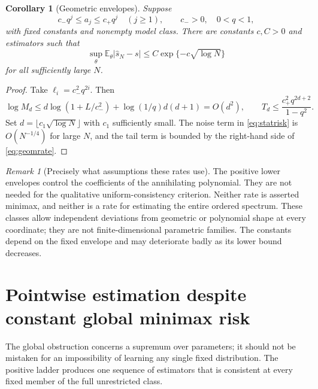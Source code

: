 \documentclass[11pt,letterpaper]{article}
\numberwithin{equation}{section}
\newtheorem{corollary}[theorem]{Corollary}
\theoremstyle{definition}
\theoremstyle{remark}
\newtheorem{remark}[theorem]{Remark}
\newcommand{\E}{\mathbb E}
\begin{document}
\begin{corollary}[Geometric envelopes]
\label{cor:geomrate}
Suppose
\begin{equation}
 c_-q^j\le a_j\le c_+q^j\quad(j\ge1),
 \qquad c_->0,\quad0<q<1,
 \label{eq:geomenvelope}
\end{equation}
with fixed constants and nonempty model class. There are constants $c,C>0$
and estimators such that
\begin{equation}
 \sup_\theta\E_\theta|\widehat s_N-s|
 \le C\exp\{-c\sqrt{\log N}\}
 \label{eq:geomrate}
\end{equation}
for all sufficiently large $N$.
\end{corollary}
\begin{proof}
Take $\ell_i=c_-^2q^{2i}$. Then
\[
 \log M_d\le d\log(1+L/c_-^2)+\log(1/q)d(d+1)=O(d^2),
 \qquad
 T_d\le\frac{c_+^2q^{2d+2}}{1-q^2}.
\]
Set $d=\lfloor c_1\sqrt{\log N}\rfloor$ with $c_1$ sufficiently small.
The noise term in \eqref{eq:statrisk} is $O(N^{-1/4})$ for large $N$, and
the tail term is bounded by the right-hand side of \eqref{eq:geomrate}.
\end{proof}

\begin{remark}[Precisely what assumptions these rates use]
The positive lower envelopes control the coefficients of the annihilating
polynomial. They are not needed for the qualitative uniform-consistency
criterion. Neither rate is asserted minimax, and neither is a rate for
estimating the entire ordered spectrum. These classes allow independent
deviations from geometric or polynomial shape at every coordinate; they are
not finite-dimensional parametric families. The constants depend on the fixed
envelope and may deteriorate badly as its lower bound decreases.
\end{remark}

\section{Pointwise estimation despite constant global minimax risk}
\label{sec:pointwise}

The global obstruction concerns a supremum over parameters; it should not be
mistaken for an impossibility of learning any single fixed distribution.
The positive ladder produces one sequence of estimators that is consistent
at every fixed member of the full unrestricted class.
\end{document}
